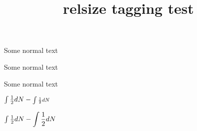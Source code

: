 \documentclass{article}
\title{relsize tagging test}
\begin{document}
Some normal text

{\larger Some normal text}


{\smaller Some normal text}


$\int\frac{1}{2}dN - \mathsmaller{\int\frac{1}{2}dN}$

$\int\frac{1}{2}dN - \mathlarger{\int\frac{1}{2}dN}$
\end{document}

